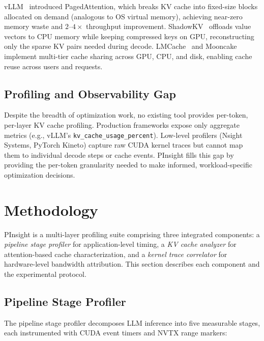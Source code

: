 \documentclass[conference]{IEEEtran}
\begin{document}
vLLM~\cite{vllm} introduced PagedAttention, which breaks KV cache into fixed-size blocks allocated on demand (analogous to OS virtual memory), achieving near-zero memory waste and $2$--$4\times$ throughput improvement. ShadowKV~\cite{shadowkv} offloads value vectors to CPU memory while keeping compressed keys on GPU, reconstructing only the sparse KV pairs needed during decode. LMCache~\cite{lmcache} and Mooncake~\cite{mooncake} implement multi-tier cache sharing across GPU, CPU, and disk, enabling cache reuse across users and requests.

\subsection{Profiling and Observability Gap}

Despite the breadth of optimization work, no existing tool provides per-token, per-layer KV cache profiling. Production frameworks expose only aggregate metrics (e.g., vLLM's \texttt{kv\_cache\_usage\_percent}). Low-level profilers (Nsight Systems, PyTorch Kineto) capture raw CUDA kernel traces but cannot map them to individual decode steps or cache events. PInsight fills this gap by providing the per-token granularity needed to make informed, workload-specific optimization decisions.

\section{Methodology}

PInsight is a multi-layer profiling suite comprising three integrated components: a \textit{pipeline stage profiler} for application-level timing, a \textit{KV cache analyzer} for attention-based cache characterization, and a \textit{kernel trace correlator} for hardware-level bandwidth attribution. This section describes each component and the experimental protocol.

\subsection{Pipeline Stage Profiler}

The pipeline stage profiler decomposes LLM inference into five measurable stages, each instrumented with CUDA event timers and NVTX range markers:
\end{document}

